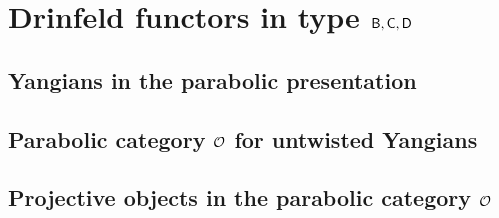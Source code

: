 \section{\texorpdfstring{Drinfeld functors in type $\mathsf{B}, \mathsf{C}, \mathsf{D}$}{}}
    \subsection{Yangians in the parabolic presentation}

    \subsection{\texorpdfstring{Parabolic category $\mathcal{O}$ for untwisted Yangians}{}}

    \subsection{\texorpdfstring{Projective objects in the parabolic category $\mathcal{O}$}{}}